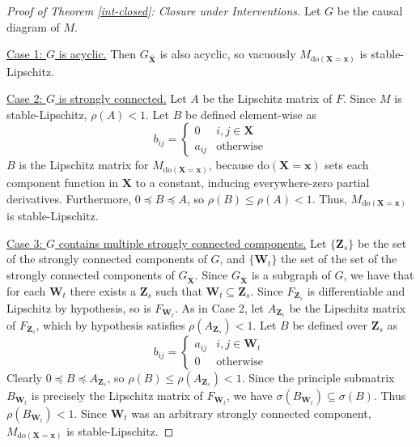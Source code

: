 \documentclass[letterpaper,10pt]{article}
\begin{document}
\begin{proof}[Proof of Theorem \ref{int-closed}: Closure under Interventions]
Let $G$ be the causal diagram of $M$. 

\underline{Case 1: $G$ is acyclic.}
Then $G_{\overline{\mathbf{X}}}$ is also acyclic, so vacuously $M_{\text{do}(\mathbf{X}=\mathbf{x})}$ is stable-Lipschitz.

\underline{Case 2: $G$ is strongly connected.}
Let $A$ be the Lipschitz matrix of $F$. Since $M$ is stable-Lipschitz, $\rho(A)<1$. Let $B$ be defined element-wise as 
\[
b_{ij} = 
\begin{cases}
  0 & i,j\in\mathbf{X} \\
  a_{ij} & \text{otherwise}
\end{cases}
\]
$B$ is the Lipschitz matrix for $M_{\text{do}(\mathbf{X}=\mathbf{x})}$, because $\text{do}(\mathbf{X}=\mathbf{x})$ sets each component function in $\mathbf{X}$ to a constant, inducing everywhere-zero partial derivatives. 
Furthermore, $0\preceq B \preceq A$, so $\rho(B)\leq\rho(A)<1$.
Thus, $M_{\text{do}(\mathbf{X}=\mathbf{x})}$ is stable-Lipschitz.

\underline{Case 3: $G$ contains multiple strongly connected components.}
Let $\{\mathbf{Z}_s\}$ be the set of the strongly connected components of $G$, and $\{\mathbf{W}_t\}$ the set of the set of the strongly connected components of $G_{\overline{\mathbf{X}}}$.
Since $G_{\overline{\mathbf{X}}}$ is a subgraph of $G$, we have that for each $\mathbf{W}_t$ there exists a $\mathbf{Z}_s$ such that $\mathbf{W}_t\subseteq\mathbf{Z}_s$.
Since $F_{\mathbf{Z}_s}$ is differentiable and Lipschitz by hypothesis, so is $F_{\mathbf{W}_t}$.
As in Case 2, let $A_{\mathbf{Z}_s}$ be the Lipschitz matrix of $F_{\mathbf{Z}_s}$, which by hypothesis satisfies $\rho(A_{\mathbf{Z}_s})<1$.
Let $B$ be defined over $\mathbf{Z}_s$ as
\[
b_{ij} = 
\begin{cases}
  a_{ij} & i,j\in\mathbf{W}_t \\
  0 & \text{otherwise}
\end{cases}
\]
Clearly $0\preceq B \preceq A_{\mathbf{Z}_s}$, so $\rho(B)\leq\rho(A_{\mathbf{Z}_s})<1$.
Since the principle submatrix $B_{\mathbf{W}_t}$ is precisely the Lipschitz matrix of $F_{{\mathbf{W}_t}}$, we have $\sigma(B_{\mathbf{W}_t})\subseteq \sigma(B)$. Thus $\rho(B_{\mathbf{W}_t})<1$.
Since $\mathbf{W}_t$ was an arbitrary strongly connected component, $M_{\text{do}(\mathbf{X}=\mathbf{x})}$ is stable-Lipschitz.
\end{proof}
\end{document}
